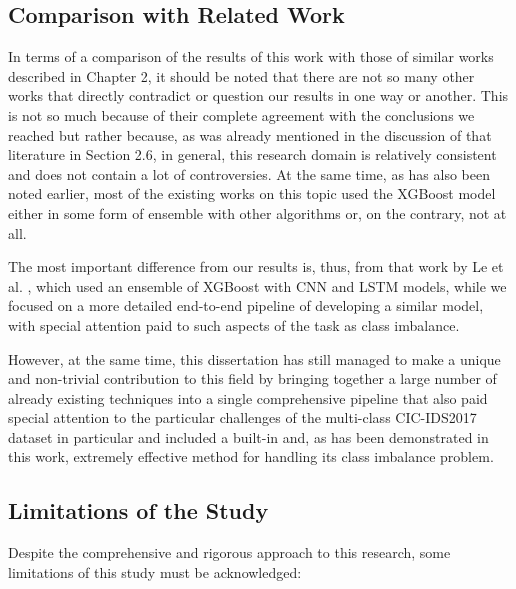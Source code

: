 \subsection{Comparison with Related Work} 

In terms of a comparison of the results of this work with those of similar works described in Chapter 2, it should be noted that there are not so many other works that directly contradict or question our results in one way or another. This is not so much because of their complete agreement with the conclusions we reached but rather because, as was already mentioned in the discussion of that literature in Section 2.6, in general, this research domain is relatively consistent and does not contain a lot of controversies. At the same time, as has also been noted earlier, most of the existing works on this topic used the XGBoost model either in some form of ensemble with other algorithms or, on the contrary, not at all.

The most important difference from our results is, thus, from that work by Le et al. \cite{le2021ensemble}, which used an ensemble of XGBoost with CNN and LSTM models, while we focused on a more detailed end-to-end pipeline of developing a similar model, with special attention paid to such aspects of the task as class imbalance.

However, at the same time, this dissertation has still managed to make a unique and non-trivial contribution to this field by bringing together a large number of already existing techniques into a single comprehensive pipeline that also paid special attention to the particular challenges of the multi-class CIC-IDS2017 dataset in particular and included a built-in and, as has been demonstrated in this work, extremely effective method for handling its class imbalance problem.

\subsection{Limitations of the Study} 

Despite the comprehensive and rigorous approach to this research, some limitations of this study must be acknowledged:

